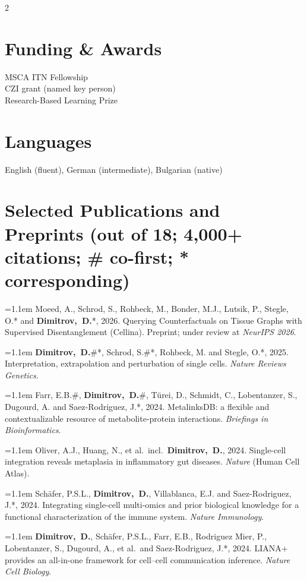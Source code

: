 \documentclass[11pt,a4paper]{article}
\newcommand{\pub}[1]{\par\hangindent=1.1em\hangafter=1 #1\vspace{9pt}}
\newcommand{\me}{\textbf{Dimitrov,~D.}}
\begin{document}
\begin{paracol}{2}
\section{Funding \& Awards}
MSCA ITN Fellowship\\[4pt]
CZI grant (named key person)\\[4pt]
Research-Based Learning Prize

\section{Languages}
English (fluent), German (intermediate), Bulgarian (native)

\end{paracol}

\newpage

\section{Selected Publications and Preprints \normalsize\mdseries\upshape(out of 18; 4,000+ citations; \# co-first; * corresponding)}

\pub{Moeed, A., Schrod, S., Rohbeck, M., Bonder, M.J., Lutsik, P., Stegle, O.* and \me*, 2026.
Querying Counterfactuals on Tissue Graphs with Supervised Disentanglement (Cellina).
Preprint; under review at \textit{NeurIPS 2026}.}

\pub{\textbf{Dimitrov,~D.}\#{}*, Schrod, S.\#{}*, Rohbeck, M. and Stegle, O.*, 2025.
Interpretation, extrapolation and perturbation of single cells.
\textit{Nature Reviews Genetics}.}

\pub{Farr, E.B.\#, \me\#, T\"urei, D., Schmidt, C., Lobentanzer, S., Dugourd, A. and Saez-Rodriguez, J.*, 2024.
MetalinksDB: a flexible and contextualizable resource of metabolite-protein interactions.
\textit{Briefings in Bioinformatics}.}

\pub{Oliver, A.J., Huang, N., et al.\ incl.\ \me, 2024.
Single-cell integration reveals metaplasia in inflammatory gut diseases.
\textit{Nature} (Human Cell Atlas).}

\pub{Sch\"afer, P.S.L., \me, Villablanca, E.J. and Saez-Rodriguez, J.*, 2024.
Integrating single-cell multi-omics and prior biological knowledge for a functional
characterization of the immune system. \textit{Nature Immunology}.}

\pub{\me, Sch\"afer, P.S.L., Farr, E.B., Rodriguez Mier, P., Lobentanzer, S., Dugourd, A., et al.\
and Saez-Rodriguez, J.*, 2024. LIANA+ provides an all-in-one framework for cell--cell
communication inference. \textit{Nature Cell Biology}.}
\end{document}
